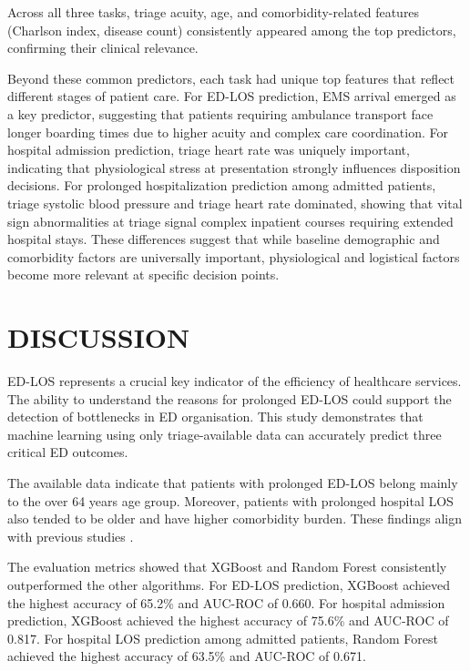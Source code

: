 \documentclass[harvard,article]{frontiersinFPHY_FAMS}
\begin{document}
Across all three tasks, triage acuity, age, and comorbidity-related features (Charlson index, disease count) consistently appeared among the top predictors, confirming their clinical relevance.

Beyond these common predictors, each task had unique top features that reflect different stages of patient care. For ED-LOS prediction, EMS arrival emerged as a key predictor, suggesting that patients requiring ambulance transport face longer boarding times due to higher acuity and complex care coordination. For hospital admission prediction, triage heart rate was uniquely important, indicating that physiological stress at presentation strongly influences disposition decisions. For prolonged hospitalization prediction among admitted patients, triage systolic blood pressure and triage heart rate dominated, showing that vital sign abnormalities at triage signal complex inpatient courses requiring extended hospital stays. These differences suggest that while baseline demographic and comorbidity factors are universally important, physiological and logistical factors become more relevant at specific decision points.

\section{DISCUSSION}

ED-LOS represents a crucial key indicator of the efficiency of healthcare services. The ability to understand the reasons for prolonged ED-LOS could support the detection of bottlenecks in ED organisation. This study demonstrates that machine learning using only triage-available data can accurately predict three critical ED outcomes.

The available data indicate that patients with prolonged ED-LOS belong mainly to the over 64 years age group. Moreover, patients with prolonged hospital LOS also tended to be older and have higher comorbidity burden. These findings align with previous studies \cite{ricciardi2024, wu2025, raita2019}.

The evaluation metrics showed that XGBoost and Random Forest consistently outperformed the other algorithms. For ED-LOS prediction, XGBoost achieved the highest accuracy of 65.2\% and AUC-ROC of 0.660. For hospital admission prediction, XGBoost achieved the highest accuracy of 75.6\% and AUC-ROC of 0.817. For hospital LOS prediction among admitted patients, Random Forest achieved the highest accuracy of 63.5\% and AUC-ROC of 0.671.
\end{document}
